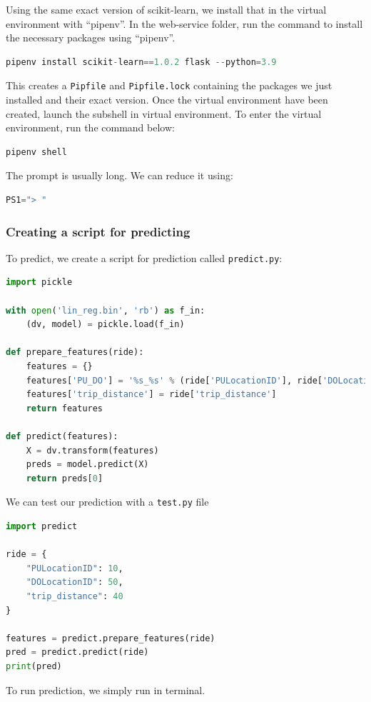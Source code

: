 \documentclass[letterpaper,12pt,notitlepage,twoside]{report}
\begin{document}
Using the same exact version of scikit-learn, we install that in the virtual environment with ``pipenv''. In the web-service folder, run the command to install the necessary packages using ``pipenv''.
\begin{lstlisting}[language=python, numbers=none]
 pipenv install scikit-learn==1.0.2 flask --python=3.9
\end{lstlisting}

This creates a \texttt{Pipfile} and \texttt{Pipfile.lock} containing the packages we just installed and their exact version. Once the virtual environment have been created, launch the subshell in virtual environment. To enter the virtual environment, run the command below:
\begin{lstlisting}[language=python, numbers=none]
pipenv shell
\end{lstlisting}
The prompt is usually long. We can reduce it using:
\begin{lstlisting}[language=python, numbers=none]
PS1="> "
\end{lstlisting}

\subsubsection{Creating a script for predicting}
To predict, we create a script for prediction called \texttt{predict.py}:

\begin{lstlisting}[language=python, numbers=none]
import pickle

with open('lin_reg.bin', 'rb') as f_in:
    (dv, model) = pickle.load(f_in)

def prepare_features(ride):
    features = {}
    features['PU_DO'] = '%s_%s' % (ride['PULocationID'], ride['DOLocationID'])
    features['trip_distance'] = ride['trip_distance']
    return features

def predict(features):
    X = dv.transform(features)
    preds = model.predict(X)
    return preds[0]
\end{lstlisting}

We can test our prediction with a \texttt{test.py} file
\begin{lstlisting}[language=python, numbers=none]
import predict

ride = {
    "PULocationID": 10,
    "DOLocationID": 50,
    "trip_distance": 40
}

features = predict.prepare_features(ride)
pred = predict.predict(ride)
print(pred)
\end{lstlisting}
To run prediction, we simply run \textbf{} in terminal.
\end{document}

